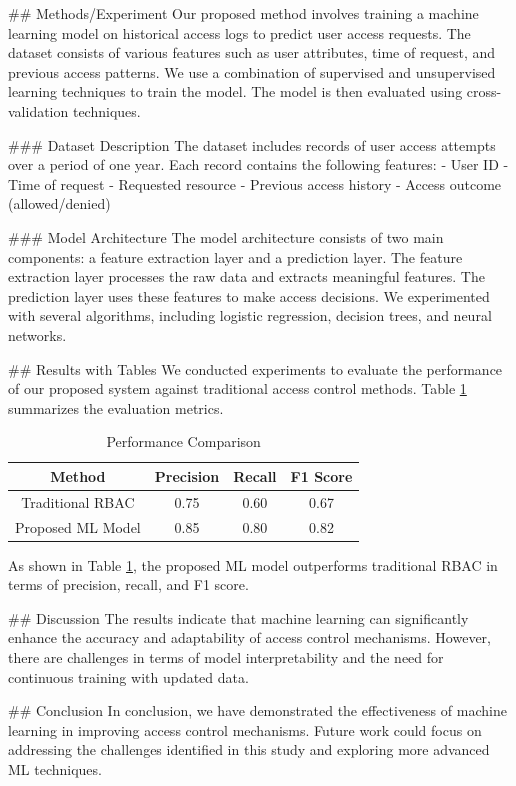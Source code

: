 ## Methods/Experiment
Our proposed method involves training a machine learning model on historical access logs to predict user access requests. The dataset consists of various features such as user attributes, time of request, and previous access patterns. We use a combination of supervised and unsupervised learning techniques to train the model. The model is then evaluated using cross-validation techniques.

### Dataset Description
The dataset includes records of user access attempts over a period of one year. Each record contains the following features:
- User ID
- Time of request
- Requested resource
- Previous access history
- Access outcome (allowed/denied)

### Model Architecture
The model architecture consists of two main components: a feature extraction layer and a prediction layer. The feature extraction layer processes the raw data and extracts meaningful features. The prediction layer uses these features to make access decisions. We experimented with several algorithms, including logistic regression, decision trees, and neural networks.

## Results with Tables
We conducted experiments to evaluate the performance of our proposed system against traditional access control methods. Table \ref{tab:results} summarizes the evaluation metrics.

\begin{table}[ht]
\centering
\caption{Performance Comparison}
\label{tab:results}
\begin{tabular}{|c|c|c|c|}
\hline
\textbf{Method} & \textbf{Precision} & \textbf{Recall} & \textbf{F1 Score} \\
\hline
Traditional RBAC & 0.75 & 0.60 & 0.67 \\
Proposed ML Model & 0.85 & 0.80 & 0.82 \\
\hline
\end{tabular}
\end{table}

As shown in Table \ref{tab:results}, the proposed ML model outperforms traditional RBAC in terms of precision, recall, and F1 score.

## Discussion
The results indicate that machine learning can significantly enhance the accuracy and adaptability of access control mechanisms. However, there are challenges in terms of model interpretability and the need for continuous training with updated data.

## Conclusion
In conclusion, we have demonstrated the effectiveness of machine learning in improving access control mechanisms. Future work could focus on addressing the challenges identified in this study and exploring more advanced ML techniques.


